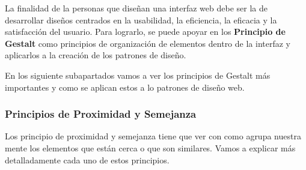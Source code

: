 La finalidad de la personas que diseñan una interfaz web debe ser la de desarrollar diseños centrados en la usabilidad, la eficiencia, la eficacia y la satisfacción del usuario. Para lograrlo, se puede apoyar en los \textbf{Principio de Gestalt} como principios de organización de elementos dentro de la interfaz y aplicarlos a la creación de los patrones de diseño.

En los siguiente subapartados vamos a ver los principios de Gestalt más importantes y como se aplican estos a lo patrones de diseño web.

\subsubsection{Principios de Proximidad y Semejanza}
Los principio de proximidad y semejanza tiene que ver con como agrupa nuestra mente los elementos que están cerca o que son similares. Vamos a explicar más detalladamente cada uno de estos principios.

